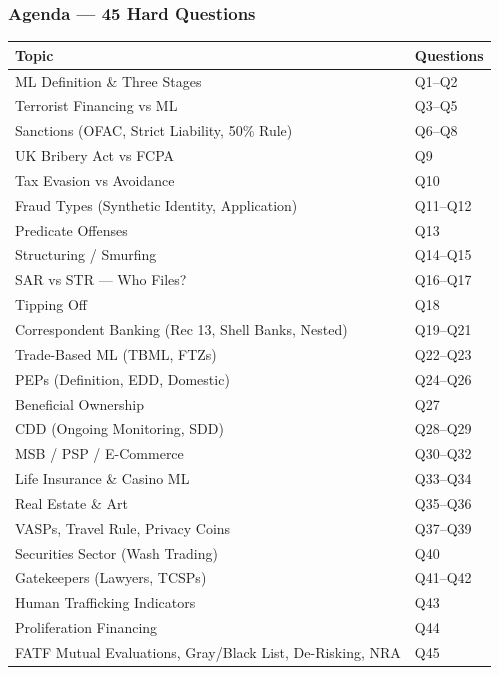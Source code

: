\documentclass[12pt,aspectratio=169]{beamer}
\renewcommand{\scriptsize}{\fontsize{5}{6}\selectfont}
\newcommand{\keypoint}[1]{\textcolor{deepblue}{\textbf{#1}}}
\begin{document}
	\begin{frame}
		\frametitle{\fontsize{11}{13}\selectfont Agenda --- 45 Hard Questions}
		\scriptsize
		\begin{longtable}{p{} p{}}
			\toprule
			\keypoint{Topic} & \keypoint{Questions} \\
			\midrule
			ML Definition \& Three Stages & Q1--Q2 \\
			Terrorist Financing vs ML & Q3--Q5 \\
			Sanctions (OFAC, Strict Liability, 50\% Rule) & Q6--Q8 \\
			UK Bribery Act vs FCPA & Q9 \\
			Tax Evasion vs Avoidance & Q10 \\
			Fraud Types (Synthetic Identity, Application) & Q11--Q12 \\
			Predicate Offenses & Q13 \\
			Structuring / Smurfing & Q14--Q15 \\
			SAR vs STR --- Who Files? & Q16--Q17 \\
			Tipping Off & Q18 \\
			Correspondent Banking (Rec 13, Shell Banks, Nested) & Q19--Q21 \\
			Trade-Based ML (TBML, FTZs) & Q22--Q23 \\
			PEPs (Definition, EDD, Domestic) & Q24--Q26 \\
			Beneficial Ownership & Q27 \\
			CDD (Ongoing Monitoring, SDD) & Q28--Q29 \\
			MSB / PSP / E-Commerce & Q30--Q32 \\
			Life Insurance \& Casino ML & Q33--Q34 \\
			Real Estate \& Art & Q35--Q36 \\
			VASPs, Travel Rule, Privacy Coins & Q37--Q39 \\
			Securities Sector (Wash Trading) & Q40 \\
			Gatekeepers (Lawyers, TCSPs) & Q41--Q42 \\
			Human Trafficking Indicators & Q43 \\
			Proliferation Financing & Q44 \\
			FATF Mutual Evaluations, Gray/Black List, De-Risking, NRA & Q45 \\
			\bottomrule
		\end{longtable}
	\end{frame}
	
\end{document}
